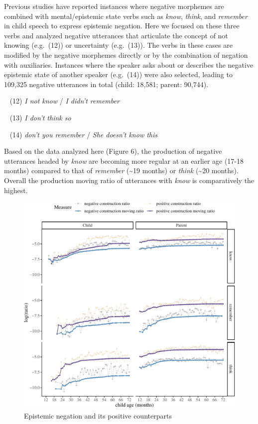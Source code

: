 \documentclass[
  english,
  man,floatsintext]{apa6}
\begin{document}
Previous studies have reported instances where negative morphemes are combined with mental/epistemic state verbs such as \emph{know}, \emph{think}, and \emph{remember} in child speech to express epistemic negation. Here we focused on these three verbs and analyzed negative utterances that articulate the concept of not knowing (e.g.~(12)) or uncertainty (e.g.~(13)). The verbs in these cases are modified by the negative morphemes directly or by the combination of negation with auxiliaries. Instances where the speaker asks about or describes the negative epistemic state of another speaker (e.g.~(14)) were also selected, leading to 109,325 negative utterances in total (child: 18,581; parent: 90,744).

~
(12) \emph{I not know} / \emph{I didn't remember}

~
(13) \emph{I don't think so}

~
(14) \emph{don't you remember} / \emph{She doesn't know this}

Based on the data analyzed here (Figure 6), the production of negative utterances headed by \emph{know} are becoming more regular at an earlier age (17-18 months) compared to that of \emph{remember} (\textasciitilde19 months) or \emph{think} (\textasciitilde20 months). Overall the production moving ratio of utterances with \emph{know} is comparatively the highest.

\begin{figure}[H]

{\centering \includegraphics{neg_construction_article_files/figure-latex/epistemic-1} 

}

\caption{Epistemic negation and its positive counterparts}\label{fig:epistemic}
\end{figure}
\end{document}
